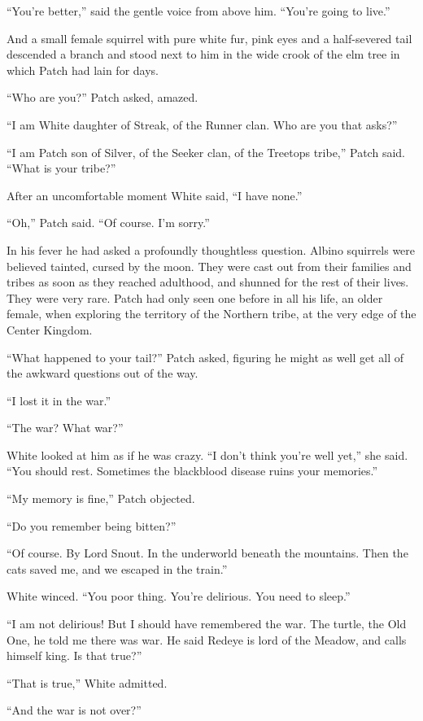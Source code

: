 \documentclass[ebook,oneside,openany,17pt]{memoir}
\begin{document}
“You’re better,” said the gentle voice from above him. “You’re going
to live.”

And a small female squirrel with pure white fur, pink eyes and a
half-severed tail descended a branch and stood next to him in the wide
crook of the elm tree in which Patch had lain for days.

“Who are you?” Patch asked, amazed.

“I am White daughter of Streak, of the Runner clan. Who are you that
asks?”

“I am Patch son of Silver, of the Seeker clan, of the Treetops tribe,”
Patch said. “What is your tribe?”

After an uncomfortable moment White said, “I have none.”

“Oh,” Patch said. “Of course. I’m sorry.”

In his fever he had asked a profoundly thoughtless question. Albino
squirrels were believed tainted, cursed by the moon. They were cast
out from their families and tribes as soon as they reached adulthood,
and shunned for the rest of their lives. They were very rare. Patch
had only seen one before in all his life, an older female, when
exploring the territory of the Northern tribe, at the very edge of the
Center Kingdom.

“What happened to your tail?” Patch asked, figuring he might as well
get all of the awkward questions out of the way.

“I lost it in the war.”

“The war? What war?”

White looked at him as if he was crazy. “I don’t think you’re well
yet,” she said. “You should rest. Sometimes the blackblood disease
ruins your memories.”

“My memory is fine,” Patch objected.

“Do you remember being bitten?”

“Of course. By Lord Snout. In the underworld beneath the
mountains. Then the cats saved me, and we escaped in the train.”

White winced. “You poor thing. You’re delirious. You need to sleep.”

“I am not delirious! But I should have remembered the war. The turtle,
the Old One, he told me there was war. He said Redeye is lord of the
Meadow, and calls himself king. Is that true?”

“That is true,” White admitted.

“And the war is not over?”
\end{document}
